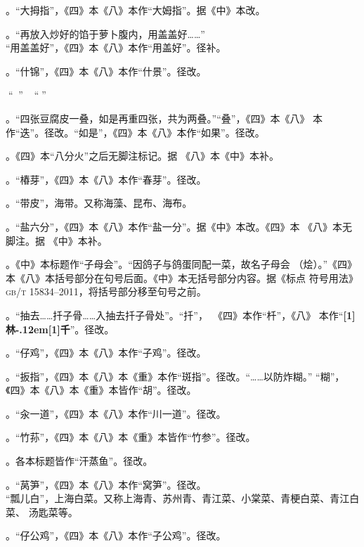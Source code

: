 。“大拇指”，《四》本《八》本作“大姆指”。据《中》本改。

。“再放入炒好的馅于萝卜腹内，用盖盖好……”\\%
“用盖盖好”，《四》本《八》本作“用盖好”。径补。

。“什锦”，《四》本《八》本作“什景”。径改。

。“𥑲水”，盐卤。“𥑲”字疑误。

。“四张豆腐皮一叠，如是再重四张，共为两叠。”“叠”，《四》本《八》
本作“迭”。径改。“如是”，《四》本《八》本作“如果”。径改。

。《四》本“八分火”之后无脚注标记{\footnotesize{}}。据
《八》本《中》本补。

。“椿芽”，《四》本《八》本作“春芽”。径改。

。“带皮”，海带。又称海藻、昆布、海布。

。“盐六分”，《四》本《八》本作“盐一分”。据《中》本改。《四》本
《八》本无脚注{\footnotesize{}}。据
《中》本补。

。《中》本标题作“子母会”。“因鸽子与鸽蛋同配一菜，故名子母会
（烩）。”《四》本《八》本括号部分在句号后面。《中》本无括号部分内容。据《标点
符号用法》\textsc{gb/t 15834--2011}，将括号部分移至句号之前。

。“抽去……扦子骨……入抽去扦子骨处”。“扦”，~《四》本作“杄”，《八》
本作“{\bfseries\scalebox{.65}[1]{林}\kern-.12em\scalebox{.55}[1]{千}}”。径改。

。“仔鸡”，《四》本《八》本作“子鸡”。径改。

。“扳指”，《四》本《八》本《重》本作“斑指”。径改。“……以防炸糊。”
“糊”，《四》本《八》本《重》本皆作“胡”。径改。

。“汆一道”，《四》本《八》本作“川一道”。径改。

。“竹荪”，《四》本《八》本《重》本皆作“竹参”。径改。

。各本标题皆作“汗蒸鱼”。径改。

。“莴笋”，《四》本《八》本作“窝笋”。径改。\\%
“瓢儿白”，上海白菜。又称上海青、苏州青、青江菜、小棠菜、青梗白菜、青江白菜、
汤匙菜等。

。“仔公鸡”，《四》本《八》本作“子公鸡”。径改。

\endgroup%

